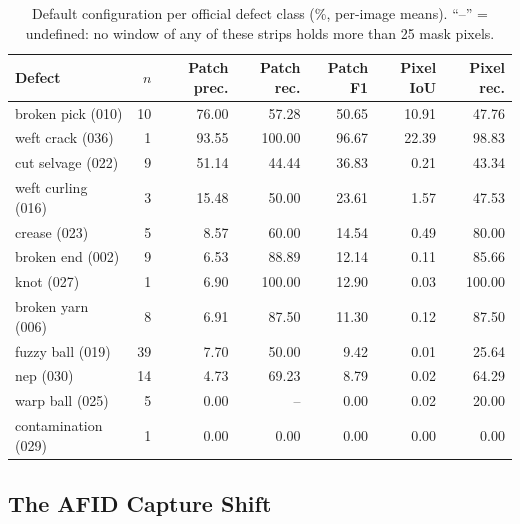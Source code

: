 \documentclass[11pt,a4paper]{article}
\begin{document}
\begin{table}[h]
\centering
\caption{Default configuration per official defect class (\%, per-image means). ``--'' = undefined: no window of any of these strips holds more than 25 mask pixels.}
\label{tab:defect}
\small
\begin{tabularx}{\textwidth}{@{}lrRRRRR@{}}
\toprule
\textbf{Defect} & $n$ & \textbf{Patch prec.} & \textbf{Patch rec.} & \textbf{Patch F1} & \textbf{Pixel IoU} & \textbf{Pixel rec.} \\
\midrule
broken pick (010) & 10 & 76.00 & 57.28 & 50.65 & 10.91 & 47.76 \\
weft crack (036) & 1 & 93.55 & 100.00 & 96.67 & 22.39 & 98.83 \\
cut selvage (022) & 9 & 51.14 & 44.44 & 36.83 & 0.21 & 43.34 \\
weft curling (016) & 3 & 15.48 & 50.00 & 23.61 & 1.57 & 47.53 \\
crease (023) & 5 & 8.57 & 60.00 & 14.54 & 0.49 & 80.00 \\
broken end (002) & 9 & 6.53 & 88.89 & 12.14 & 0.11 & 85.66 \\
knot (027) & 1 & 6.90 & 100.00 & 12.90 & 0.03 & 100.00 \\
broken yarn (006) & 8 & 6.91 & 87.50 & 11.30 & 0.12 & 87.50 \\
fuzzy ball (019) & 39 & 7.70 & 50.00 & 9.42 & 0.01 & 25.64 \\
nep (030) & 14 & 4.73 & 69.23 & 8.79 & 0.02 & 64.29 \\
warp ball (025) & 5 & 0.00 & -- & 0.00 & 0.02 & 20.00 \\
contamination (029) & 1 & 0.00 & 0.00 & 0.00 & 0.00 & 0.00 \\
\bottomrule
\end{tabularx}
\end{table}

\subsection*{The AFID Capture Shift}
\end{document}
